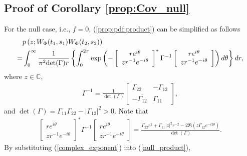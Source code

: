 \documentclass{amsart}
\begin{document}
\subsection{Proof of Corollary \ref{prop:Cov_null}}\label{sec:proof:prop:Cov_null}
For the null case, i.e., $f=0$, (\ref{prop:pdf:product}) can be simplified as follows
\begin{align}\label{null_product}
&p\left(z;W_{\Phi}(t_{1},s_{1})W_{\Phi}(t_{2},s_{2})\right)
\\\notag=&
\int_{0}^{\infty}\frac{1}{\pi^{2}\textup{det}(\Gamma)r}\left\{\int_{0}^{2\pi}
\textup{exp}\left(-
\left[\begin{array}{cc}re^{i\theta}\\ zr^{-1}e^{-i\theta}\end{array}\right]^{*}
\Gamma^{-1}
\left[\begin{array}{cc}re^{i\theta}\\ zr^{-1}e^{-i\theta}\end{array}\right]\right)d\theta\right\} dr,
\end{align}
where $z\in \mathbb{C}$,
\begin{align*}
\Gamma^{-1}=
\frac{1}{\det(\Gamma)}\left[\begin{array}{rr}\Gamma_{22} & -\Gamma_{12}\\ -\overline{\Gamma_{12}} & \Gamma_{11}\end{array}\right],
\end{align*}
and
$\det(\Gamma)=\Gamma_{11}\Gamma_{22}-|\Gamma_{12}|^{2}>0$.
Note that
\begin{align}\label{complex_exponent}
\left[\begin{array}{cc}re^{i\theta}\\ zr^{-1}e^{-i\theta}\end{array}\right]^{*}
\Gamma^{-1}
\left[\begin{array}{cc}re^{i\theta}\\ zr^{-1}e^{-i\theta}\end{array}\right]
=\frac{\Gamma_{22} r^{2}+\Gamma_{11}|z|^{2}r^{-2}-2\mathfrak{R}\left(z\Gamma_{12}e^{-i2\theta}\right)}
{\det(\Gamma)}.
\end{align}
By substituting (\ref{complex_exponent}) into (\ref{null_product}),
\end{document}
